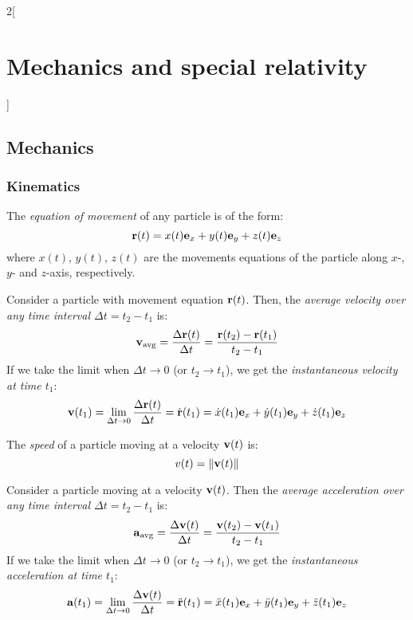\documentclass[../../../main.tex]{subfiles}
\begin{document}
\begin{multicols}{2}[\section{Mechanics and special relativity}]
  \subsection{Mechanics}
  \subsubsection{Kinematics}
  \begin{definition}
    The \textit{equation of movement} of any particle is of the form:
    $$\boldsymbol{\mathrm{r}}(t)=x(t)\boldsymbol{\mathrm{e}}_x+y(t)\boldsymbol{\mathrm{e}}_y+z(t)\boldsymbol{\mathrm{e}}_z$$ where $x(t)$, $y(t)$, $z(t)$ are the movements equations of the particle along $x$-, $y$- and $z$-axis, respectively.
  \end{definition}
  \begin{definition}
    Consider a particle with movement equation $\boldsymbol{\mathrm{r}}(t)$. Then, the \textit{average velocity over any time interval $\Delta t=t_2-t_1$} is:
    $$\boldsymbol{\mathrm{v}}_\text{avg}=\frac{\Delta\boldsymbol{\mathrm{r}}(t)}{\Delta t}=\frac{\boldsymbol{\mathrm{r}}(t_2)-\boldsymbol{\mathrm{r}}(t_1)}{t_2-t_1}$$
    If we take the limit when $\Delta t\to0$ (or $t_2\to t_1$), we get the \textit{instantaneous velocity at time $t_1$}: $$\boldsymbol{\mathrm{v}}(t_1)=\lim_{\Delta t\to 0}\frac{\Delta\boldsymbol{\mathrm{r}}(t)}{\Delta t}=\dot{\boldsymbol{\mathrm{r}}}(t_1)=\dot{x}(t_1)\boldsymbol{\mathrm{e}}_x+\dot{y}(t_1)\boldsymbol{\mathrm{e}}_y+\dot{z}(t_1)\boldsymbol{\mathrm{e}}_z$$
  \end{definition}
  \begin{definition}
    The \textit{speed} of a particle moving at a velocity $\boldsymbol{\mathrm{v}}(t)$ is:
    $$v(t)=\|\boldsymbol{\mathrm{v}}(t)\|$$
  \end{definition}
  \begin{definition}
    Consider a particle moving at a velocity $\boldsymbol{\mathrm{v}}(t)$. Then the \textit{average acceleration over any time interval $\Delta t=t_2-t_1$} is:
    $$\boldsymbol{\mathrm{a}}_\text{avg}=\frac{\Delta\boldsymbol{\mathrm{v}}(t)}{\Delta t}=\frac{\boldsymbol{\mathrm{v}}(t_2)-\boldsymbol{\mathrm{v}}(t_1)}{t_2-t_1}$$
    If we take the limit when $\Delta t\to0$ (or $t_2\to t_1$), we get the \textit{instantaneous acceleration at time $t_1$}: $$\boldsymbol{\mathrm{a}}(t_1)=\lim_{\Delta t\to 0}\frac{\Delta\boldsymbol{\mathrm{v}}(t)}{\Delta t}=\ddot{\boldsymbol{\mathrm{r}}}(t_1)=\ddot{x}(t_1)\boldsymbol{\mathrm{e}}_x+\ddot{y}(t_1)\boldsymbol{\mathrm{e}}_y+\ddot{z}(t_1)\boldsymbol{\mathrm{e}}_z$$

\end{definition}
\end{multicols}
\end{document}
